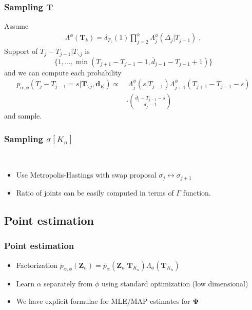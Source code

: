 \documentclass[final,hyperref={pdfpagelabels=false},noamsthm]{beamer}
\def\aDist{\Lambda}
\newcommand{\ee}{Z} %
\newcommand{\bfee}{\mathbf{\ee}}
\newcommand{\bfT}{\mathbf{T}}
\newcommand{\bfPsi}{\boldsymbol{\Psi}}
\newcommand{\bfd}{\mathbf{d}}
\begin{document}
\begin{frame}
	\frametitle{Sampling $\bfT$}
	Assume
	\begin{align*}
	\aDist^{\phi}(\bfT_k) = \delta_{T_1}(1) \prod_{j=2}^k \aDist_j^{\phi}(\Delta_j | T_{j-1}) \;,
	\end{align*}
	Support of $T_j - T_{j-1} | T_{\backslash j}$ is
	\begin{equation*}
		\{ 1, ..., \min(T_{j+1} - T_{j-1} - 1, \bar{d}_{j-1} - T_{j-1} + 1)  \}
	\end{equation*}
	and we can compute each probability
	\begin{align*}
		p_{\alpha, \phi}(T_j - T_{j-1} = s | \bfT_{\backslash j} , \bfd_{K}) \propto &\  \Lambda_j^\phi(s|T_{j-1})\Lambda_{j+1}^\phi (T_{j+1}-T_{j-1} - s) \\
		&\cdot \binom{\bar{d}_j - T_{j-1} - s}{d_j - 1}
	\end{align*}
	and sample.
\end{frame}

\begin{frame}
	\frametitle{Sampling $\sigma[K_n]$}\

	\begin{itemize} 
	\item Use Metropolis-Hastings with swap proposal $\sigma_j \leftrightarrow \sigma_{j+1}$
	
	\item Ratio of joints can be easily computed in terms of $\Gamma$ function.
	\end{itemize}
\end{frame}

\subsection{Point estimation}
\begin{frame}
	\frametitle{Point estimation}
	\begin{itemize} 
	
		\item Factorization $p_{\alpha, \phi}(\bfee_n) = p_\alpha (\bfee_n | \bfT_{K_n})\Lambda_\phi(\bfT_{K_n})$ 

		\item Learn $\alpha$ separately from $\phi$ using standard optimization (low dimensional)
	
		\item We have explicit formulae for MLE/MAP estimates for $\bfPsi$
	\end{itemize}
\end{frame}
\end{document}
